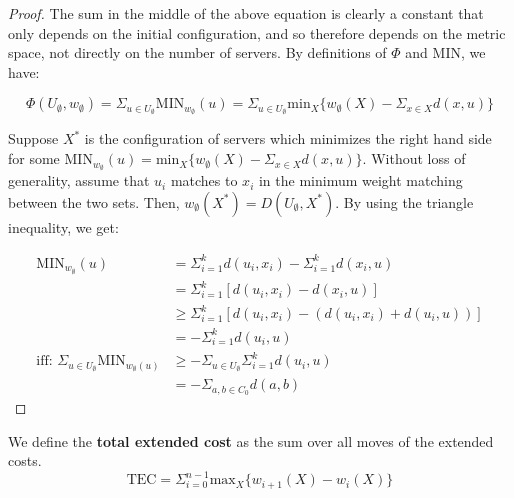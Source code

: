 \begin{proof}
    The sum in the middle of the above equation is clearly a constant that only depends on the initial configuration, and so therefore depends on the metric space, not directly on the number of servers. By definitions of $\Phi$ and $\mathrm{MIN}$, we have:

    \begin{equation*}
        \Phi(U_\emptyset, w_\emptyset) = \Sigma_{u \in U_\emptyset} \mathrm{MIN}_{w_\emptyset}(u) = \Sigma_{u \in U_\emptyset} \mathrm{min}_X \{ w_\emptyset(X) - \Sigma_{x \in X} d(x, u)\}
    \end{equation*}

    Suppose $X^*$ is the configuration of servers which minimizes the right hand side for some $\mathrm{MIN}_{w_\emptyset}(u) = \mathrm{min}_X \{ w_\emptyset(X) - \Sigma_{x \in X} d(x, u)\}$. Without loss of generality, assume that $u_i$ matches to $x_i$ in the minimum weight matching between the two sets. Then, $w_\emptyset(X^*) = D(U_\emptyset, X^*)$. By using the triangle inequality, we get:

    \begin{equation*}
        \begin{split}
            \mathrm{MIN}_{w_\emptyset}(u) &= \Sigma_{i=1}^k d(u_i, x_i) - \Sigma_{i=1}^k d(x_i , u) \\
            &= \Sigma_{i=1}^k [d(u_i, x_i) - d(x_i, u)] \\
            &\geq \Sigma_{i=1}^k [d(u_i, x_i) - (d(u_i, x_i) + d(u_i, u))] \\
            &= - \Sigma_{i=1}^k d(u_i, u) \\
            \text{iff: }\Sigma_{u \in U_\emptyset} \mathrm{MIN}_{w_\emptyset(u)} &\geq -\Sigma_{u \in U_\emptyset} \Sigma_{i=1}^k d(u_i, u) \\
            &= - \Sigma_{a, b \in C_0} d(a, b)
        \end{split}
    \end{equation*}
\end{proof}

\begin{definition}
    We define the \textbf{total extended cost} as the sum over all moves of the extended costs.
    \begin{equation*}
        \mathrm{TEC} = \Sigma_{i = 0}^{n-1} \mathrm{max}_X \{ w_{i+1} (X) - w_i(X)\}
    \end{equation*}
\end{definition}

